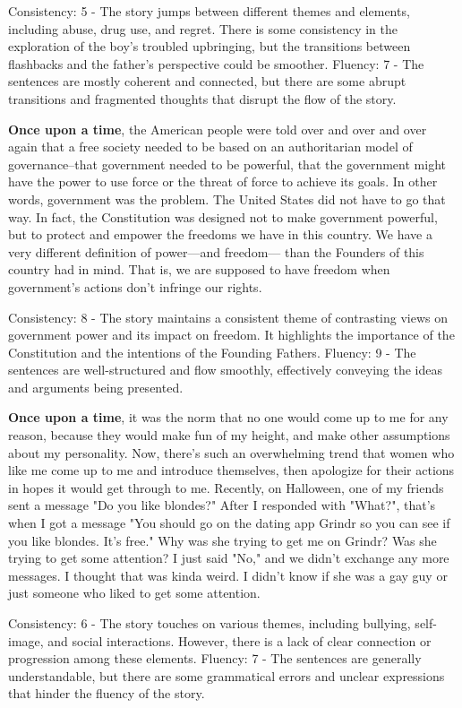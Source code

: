 \documentclass{article}
\begin{document}
Consistency: 5 - The story jumps between different themes and elements, including abuse, drug use, and regret. There is some consistency in the exploration of the boy's troubled upbringing, but the transitions between flashbacks and the father's perspective could be smoother.
Fluency: 7 - The sentences are mostly coherent and connected, but there are some abrupt transitions and fragmented thoughts that disrupt the flow of the story.

\textbf{Once upon a time}, the American people were told over and over and over again that a free society needed to be based on an authoritarian model of governance--that government needed to be powerful, that the government might have the power to use force or the threat of force to achieve its goals. In other words, government was the problem. The United States did not have to go that way. In fact, the Constitution was designed not to make government powerful, but to protect and empower the freedoms we have in this country. We have a very different definition of power—and freedom— than the Founders of this country had in mind. That is, we are supposed to have freedom when government's actions don't infringe our rights.

Consistency: 8 - The story maintains a consistent theme of contrasting views on government power and its impact on freedom. It highlights the importance of the Constitution and the intentions of the Founding Fathers.
Fluency: 9 - The sentences are well-structured and flow smoothly, effectively conveying the ideas and arguments being presented.

\textbf{Once upon a time}, it was the norm that no one would come up to me for any reason, because they would make fun of my height, and make other assumptions about my personality. Now, there's such an overwhelming trend that women who like me come up to me and introduce themselves, then apologize for their actions in hopes it would get through to me. Recently, on Halloween, one of my friends sent a message "Do you like blondes?" After I responded with "What?", that's when I got a message "You should go on the dating app Grindr so you can see if you like blondes. It's free." Why was she trying to get me on Grindr? Was she trying to get some attention? I just said "No," and we didn't exchange any more messages. I thought that was kinda weird. I didn't know if she was a gay guy or just someone who liked to get some attention.

Consistency: 6 - The story touches on various themes, including bullying, self-image, and social interactions. However, there is a lack of clear connection or progression among these elements.
Fluency: 7 - The sentences are generally understandable, but there are some grammatical errors and unclear expressions that hinder the fluency of the story.
\end{document}
